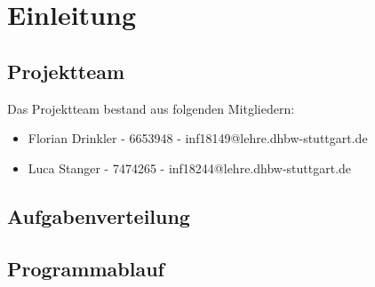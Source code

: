 
\chapter{Einleitung}\label{ch:einleitung}
\section{Projektteam}\label{sec:projektteam}
Das Projektteam bestand aus folgenden Mitgliedern:
\begin{itemize}
	\item Florian Drinkler - 6653948 - inf18149@lehre.dhbw-stuttgart.de
	\item Luca Stanger - 7474265 - inf18244@lehre.dhbw-stuttgart.de
\end{itemize}
\section{Aufgabenverteilung}\label{sec:aufgabenverteilung}

\section{Programmablauf}\label{sec:programmablauf}
